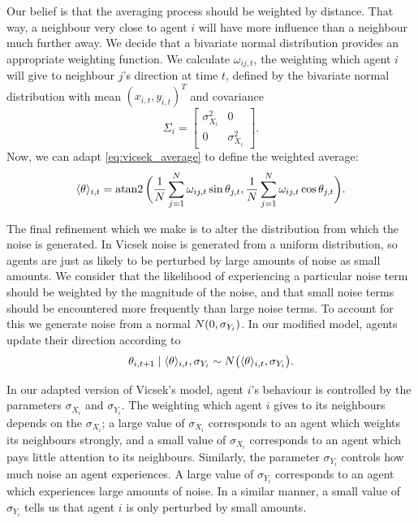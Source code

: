Our belief is that the averaging process should be weighted by distance. That way, a neighbour very close to agent $i$ will have more influence than a neighbour much further away. We decide that a bivariate normal distribution provides an appropriate weighting function. We calculate $\omega_{ij, t}$, the weighting which agent $i$ will give to neighbour $j$'s direction at time $t$, defined by the bivariate normal distribution with mean $(x_{i, t}, y_{i, t})^T$ and covariance
\[
	\Sigma_i = \begin{bmatrix}
		\sigma_{X_i}^2 & 0 \\
		0 & \sigma_{X_i}^2
	\end{bmatrix}.
\]
Now, we can adapt \cref{eq:vicsek_average} to define the weighted average:
\begin{equation}
\label{eq:weighted_average}
	\langle \theta \rangle_{i, t} = \operatorname{atan2} \bigg( \frac{1}{N} \sum_{j=1}^N \omega_{ij, t} \sin{\theta_{j ,t}}, \frac{1}{N} \sum_{j=1}^N \omega_{ij, t} \cos{\theta_{j, t}} \bigg).
\end{equation}

The final refinement which we make is to alter the distribution from which the noise is generated. In Vicsek noise is generated from a uniform distribution, so agents are just as likely to be perturbed by large amounts of noise as small amounts. We consider that the likelihood of experiencing a particular noise term should be weighted by the magnitude of the noise, and that small noise terms should be encountered more frequently than large noise terms. To account for this we generate noise from a normal $N(0, \sigma_{Y_i})$. In our modified model, agents update their direction according to
\begin{equation}
\label{eq:weighted_update}
	\theta_{i,t+1} \mid \langle \theta \rangle_{i, t}, \sigma_{Y_i} \sim N\big(\langle \theta \rangle_{i, t}, \sigma_{Y_i}\big).
\end{equation}

In our adapted version of Vicsek's model, agent $i$'s behaviour is controlled by the parameters $\sigma_{X_i}$ and $\sigma_{Y_i}$. The weighting which agent $i$ gives to its neighbours depends on the $\sigma_{X_i}$; a large value of $\sigma_{X_i}$ corresponds to an agent which weights its neighbours strongly, and a small value of $\sigma_{X_i}$ corresponds to an agent which pays little attention to its neighbours. Similarly, the parameter $\sigma_{Y_i}$ controls how much noise an agent experiences. A large value of $\sigma_{Y_i}$ corresponds to an agent which experiences large amounts of noise. In a similar manner, a small value of $\sigma_{Y_i}$ tells us that agent $i$ is only perturbed by small amounts.

